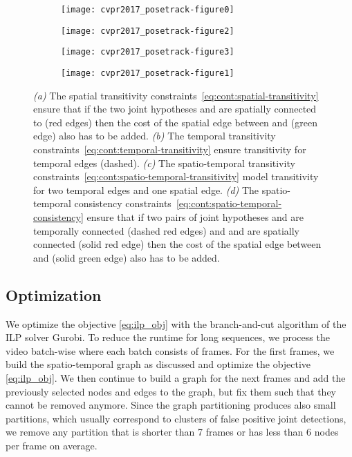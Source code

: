 \documentclass[10pt,twocolumn,letterpaper]{article}
\begin{document}
\begin{figure}[t]
\captionsetup[subfigure]{justification=centering}
\centering
\begin{subfigure}[t]{0.11\textwidth}
\texttt{[image: cvpr2017\_posetrack-figure0]}
\caption{}
\label{fig:constraints-illua}
\end{subfigure}
\hfill
\begin{subfigure}[t]{0.11\textwidth}
\texttt{[image: cvpr2017\_posetrack-figure2]}
\caption{}
\label{fig:constraints-illub}
\end{subfigure}
\hfill
\begin{subfigure}[t]{0.11\textwidth}
\texttt{[image: cvpr2017\_posetrack-figure3]}
\caption{}
\label{fig:constraints-illuc}
\end{subfigure}
\hfill
\begin{subfigure}[t]{0.11\textwidth}
\texttt{[image: cvpr2017\_posetrack-figure1]}
\caption{}
\label{fig:constraints-illud}
\end{subfigure}
\caption{
\emph{(a)} The spatial transitivity constraints~\eqref{eq:cont:spatial-transitivity} ensure that if the two joint hypotheses  and  are spatially connected to  (red edges) then the cost of the spatial edge between  and  (green edge) also has to be added. \emph{(b)} The temporal transitivity constraints~\eqref{eq:cont:temporal-transitivity} ensure transitivity for temporal edges (dashed). \emph{(c)} The spatio-temporal transitivity constraints~\eqref{eq:cont:spatio-temporal-transitivity} model transitivity for two temporal edges and one spatial edge. \emph{(d)} The spatio-temporal consistency constraints~\eqref{eq:cont:spatio-temporal-consistency} ensure that if two pairs of joint hypotheses  and  are temporally connected (dashed red edges) and  and  are spatially connected (solid red edge) then the cost of the spatial edge between  and  (solid green edge) also has to be added.
}
\label{fig:contraints}
\end{figure}

\subsection{Optimization}
We optimize the objective \eqref{eq:ilp_obj} with the branch-and-cut algorithm of the ILP solver Gurobi. To reduce the runtime for long sequences, we process the video batch-wise where each batch consists of  frames. For the first  frames, we build the spatio-temporal graph as discussed and optimize the objective \eqref{eq:ilp_obj}. We then continue to build a graph for the next  frames and add the previously selected nodes and edges to the graph, but fix them such that they cannot be removed anymore. Since the graph partitioning produces also small partitions, which usually correspond to clusters of false positive joint detections, we remove any partition that is shorter than 7 frames or has less than 6 nodes per frame on average. 
\end{document}
